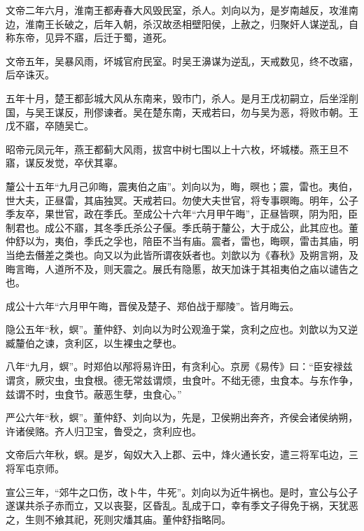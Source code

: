 \documentclass[12pt,UTF8]{ctexbook}
\begin{document}
文帝二年六月，淮南王都寿春大风毁民室，杀人。刘向以为，是岁南越反，攻淮南边，淮南王长破之，后年入朝，杀汉故丞相壁阳侯，上赦之，归聚奸人谋逆乱，自称东帝，见异不寤，后迁于蜀，道死。



文帝五年，吴暴风雨，坏城官府民室。时吴王濞谋为逆乱，天戒数见，终不改寤，后卒诛灭。



五年十月，楚王都彭城大风从东南来，毁市门，杀人。是月王戊初嗣立，后坐淫削国，与吴王谋反，刑僇谏者。吴在楚东南，天戒若曰，勿与吴为恶，将败市朝。王戊不寤，卒随吴亡。



昭帝元凤元年，燕王都蓟大风雨，拔宫中树七围以上十六枚，坏城楼。燕王旦不寤，谋反发觉，卒伏其辜。



釐公十五年“九月己卯晦，震夷伯之庙”。刘向以为，晦，暝也；震，雷也。夷伯，世大夫，正昼雷，其庙独冥。天戒若曰。勿使大夫世官，将专事暝晦。明年，公子季友卒，果世官，政在季氏。至成公十六年“六月甲午晦”，正昼皆暝，阴为阳，臣制君也。成公不寤，其冬季氏杀公子偃。季氏萌于釐公，大于成公，此其应也。董仲舒以为，夷伯，季氏之孚也，陪臣不当有庙。震者，雷也，晦暝，雷击其庙，明当绝去僭差之类也。向又以为此皆所谓夜妖者也。刘歆以为《春秋》及朔言朔，及晦言晦，人道所不及，则天震之。展氏有隐慝，故天加诛于其祖夷伯之庙以谴告之也。



成公十六年“六月甲午晦，晋侯及楚子、郑伯战于鄢陵”。皆月晦云。



隐公五年“秋，螟”。董仲舒、刘向以为时公观渔于棠，贪利之应也。刘歆以为又逆臧釐伯之谏，贪利区，以生裸虫之孽也。



八年“九月，螟”。时郑伯以邴将易许田，有贪利心。京房《易传》曰：“臣安禄兹谓贪，厥灾虫，虫食根。德无常兹谓烦，虫食叶。不绌无德，虫食本。与东作争，兹谓不时，虫食节。蔽恶生孽，虫食心。”



严公六年“秋，螟”。董仲舒、刘向以为，先是，卫侯朔出奔齐，齐侯会诸侯纳朔，许诸侯赂。齐人归卫宝，鲁受之，贪利应也。



文帝后六年秋，螟。是岁，匈奴大入上郡、云中，烽火通长安，遣三将军屯边，三将军屯京师。



宣公三年，“郊牛之口伤，改卜牛，牛死”。刘向以为近牛祸也。是时，宣公与公子遂谋共杀子赤而立，又以丧娶，区昏乱。乱成于口，幸有季文子得免于祸，天犹恶之，生则不飨其祀，死则灾燔其庙。董仲舒指略同。
\end{document}
